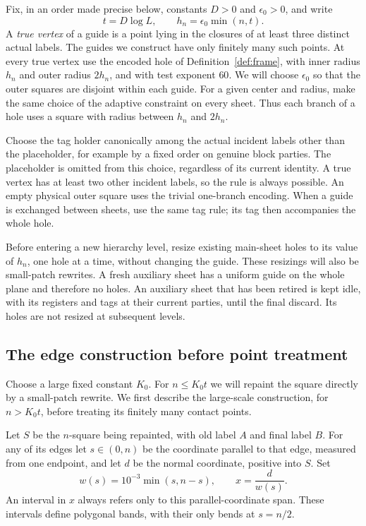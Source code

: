 Fix, in an order made precise below, constants $D>0$ and
$\epsilon_0>0$, and write
\begin{equation}
 t=D\log L,
 \qquad h_n=\epsilon_0\min(n,t).
 \label{eq:geometry-scales}
\end{equation}
A \emph{true vertex} of a guide is a point lying in the closures of at
least three distinct actual labels.  The guides we construct have only
finitely many such points.  At every true vertex use the encoded hole
of Definition~\ref{def:frame}, with inner radius $h_n$ and outer radius
$2h_n$, and with test exponent $60$.  We will choose $\epsilon_0$ so
that the outer squares are disjoint within each guide.  For a given
center and radius, make the same choice of the adaptive constraint on
every sheet.  Thus each branch of a hole uses a square with radius
between $h_n$ and $2h_n$.

Choose the tag holder canonically among the actual incident labels
other than the placeholder, for example by a fixed order on genuine
block parties.  The placeholder is omitted from this choice, regardless
of its current identity.  A true vertex has at least two other incident
labels, so the rule is always possible.  An empty physical outer square
uses the trivial one-branch encoding.  When a guide is exchanged between
sheets, use the same tag rule; its tag then accompanies the whole hole.

Before entering a new hierarchy level, resize existing main-sheet holes
to its value of $h_n$, one hole at a time, without changing the guide.
These resizings will also be small-patch rewrites.  A fresh auxiliary
sheet has a uniform guide on the whole plane and therefore no holes.
An auxiliary sheet that has been retired is kept idle, with its
registers and tags at their current parties, until the final discard.
Its holes are not resized at subsequent levels.

\subsection{The edge construction before point treatment}

Choose a large fixed constant $K_0$.  For $n\le K_0t$ we will repaint
the square directly by a small-patch rewrite.  We first describe the
large-scale construction, for $n>K_0t$, before treating its finitely
many contact points.

Let $S$ be the $n$-square being repainted, with old label $A$ and final
label $B$.  For any of its edges let $s\in(0,n)$ be the coordinate
parallel to that edge, measured from one endpoint, and let $d$ be the
normal coordinate, positive into $S$.  Set
\begin{equation}
 w(s)=10^{-3}\min(s,n-s),
 \qquad x=\frac{d}{w(s)}.
 \label{eq:geometry-band}
\end{equation}
An interval in $x$ always refers only to this parallel-coordinate span.
These intervals define polygonal bands, with their only bends at
$s=n/2$.

